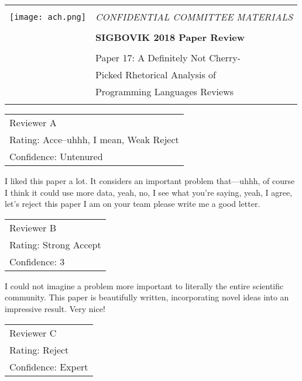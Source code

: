 \documentclass[12pt]{article}
\begin{document}
{\sffamily
\begin{tabular}{ll}
\multirow{3}{*}{\texttt{[image: ach.png]}}\\
& \Large{\em CONFIDENTIAL COMMITTEE MATERIALS} \\
&\\
& \textbf{\Huge{SIGBOVIK 2018 Paper Review}} \\
&\\
& \LARGE{Paper 17: A Definitely Not Cherry-} \\[0.25em]
& \LARGE{Picked Rhetorical Analysis of} \\[0.25em]
& \LARGE{Programming Languages Reviews} \\
&\\
\hline
\end{tabular}}
\vspace{2em}
\thispagestyle{empty}

\vspace{-2em}
{\large\bf
\begin{tabular}{l}
Reviewer A \\
Rating: Acce--uhhh, I mean, Weak Reject \\
Confidence: Untenured \\
\end{tabular}}
\vspace{-0.25em}

I liked this paper a lot.
It considers an important problem that---uhhh,
of course I think it could use more data,
yeah, no, I see what you're saying, yeah, I agree, let's reject this paper
I am on your team please write me a good letter.


{\large\bf
\begin{tabular}{l}
Reviewer B \\
Rating: Strong Accept \\
Confidence: \raisebox{0.075em}{\textless}3 \\
\end{tabular}}
\vspace{-0.25em}

I could not imagine a problem more important
to literally the entire scientific community.
This paper is beautifully written,
incorporating novel ideas into an impressive result.
Very nice!


{\large\bf
\begin{tabular}{l}
Reviewer C \\
Rating: Reject \\
Confidence: Expert \\
\end{tabular}}
\vspace{-0.25em}
\end{document}
